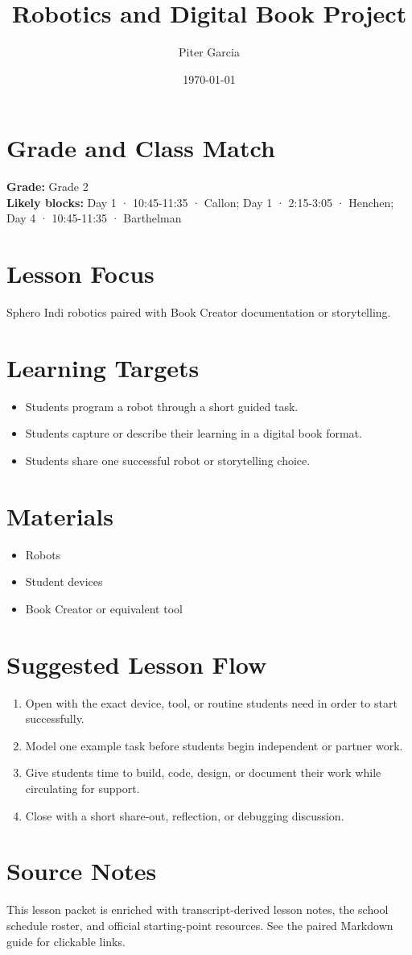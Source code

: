 \documentclass[11pt]{article}
\title{Robotics and Digital Book Project}
\author{Piter Garcia}
\date{\today}
\begin{document}
\maketitle

\section*{Grade and Class Match}
\textbf{Grade:} Grade 2\\
\textbf{Likely blocks:} Day 1 · 10:45-11:35 · Callon; Day 1 · 2:15-3:05 · Henchen; Day 4 · 10:45-11:35 · Barthelman

\section*{Lesson Focus}
Sphero Indi robotics paired with Book Creator documentation or storytelling.

\section*{Learning Targets}
\begin{itemize}[leftmargin=*]
\item Students program a robot through a short guided task.
\item Students capture or describe their learning in a digital book format.
\item Students share one successful robot or storytelling choice.
\end{itemize}

\section*{Materials}
\begin{itemize}[leftmargin=*]
\item Robots
\item Student devices
\item Book Creator or equivalent tool
\end{itemize}

\section*{Suggested Lesson Flow}
\begin{enumerate}[leftmargin=*]
\item Open with the exact device, tool, or routine students need in order to start successfully.
\item Model one example task before students begin independent or partner work.
\item Give students time to build, code, design, or document their work while circulating for support.
\item Close with a short share-out, reflection, or debugging discussion.
\end{enumerate}

\section*{Source Notes}
This lesson packet is enriched with transcript-derived lesson notes, the school schedule roster, and official starting-point resources. See the paired Markdown guide for clickable links.



\end{document}
